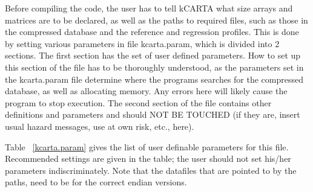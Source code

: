 \documentclass[12pt]{article}
\newcommand{\kc}{\textsf{kCARTA}\xspace}
\begin{document}
Before compiling the code, the user has to tell \kc what size arrays
and matrices are to be declared, as well as the paths to required
files, such as those in the compressed database and the reference and
regression profiles.  This is done by setting various parameters in
file {\sf kcarta.param}, which is divided into 2 sections.  The first
section has the set of user defined parameters.  How to set up this
section of the file has to be thoroughly understood, as the parameters
set in the {\sf kcarta.param} file determine where the programs
searches for the compressed database, as well as allocating memory.
Any errors here will likely cause the program to stop execution. The
second section of the file contains other definitions and parameters
and should NOT BE TOUCHED (if they are, insert usual hazard messages,
use at own risk, etc., here).

Table ~\ref{kcarta.param} gives the list of user definable parameters
for this file.  Recommended settings are given in the table; the user
should not set his/her parameters indiscriminately. Note that the datafiles
that are pointed to by the paths, need to be for the correct endian versions.

\newpage
\end{document}
